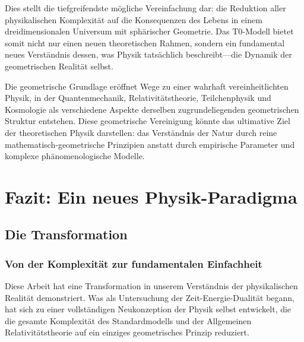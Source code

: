 \documentclass[12pt,a4paper]{report}
\begin{document}
	Dies stellt die tiefgreifendste mögliche Vereinfachung dar: die Reduktion aller physikalischen Komplexität auf die Konsequenzen des Lebens in einem dreidimensionalen Universum mit sphärischer Geometrie. Das T0-Modell bietet somit nicht nur einen neuen theoretischen Rahmen, sondern ein fundamental neues Verständnis dessen, was Physik tatsächlich beschreibt—die Dynamik der geometrischen Realität selbst.
	
	Die geometrische Grundlage eröffnet Wege zu einer wahrhaft vereinheitlichten Physik, in der Quantenmechanik, Relativitätstheorie, Teilchenphysik und Kosmologie als verschiedene Aspekte derselben zugrundeliegenden geometrischen Struktur entstehen. Diese geometrische Vereinigung könnte das ultimative Ziel der theoretischen Physik darstellen: das Verständnis der Natur durch reine mathematisch-geometrische Prinzipien anstatt durch empirische Parameter und komplexe phänomenologische Modelle.
	\chapter{Fazit: Ein neues Physik-Paradigma}
	\label{chap:conclusion}
	
	\section{Die Transformation}
	\label{sec:revolutionary_transformation}
	
	\subsection{Von der Komplexität zur fundamentalen Einfachheit}
	\label{subsec:complexity_to_simplicity}
	
	Diese Arbeit hat eine Transformation in unserem Verständnis der physikalischen Realität demonstriert. Was als Untersuchung der Zeit-Energie-Dualität begann, hat sich zu einer vollständigen Neukonzeption der Physik selbst entwickelt, die die gesamte Komplexität des Standardmodells und der Allgemeinen Relativitätstheorie auf ein einziges geometrisches Prinzip reduziert.
	
\end{document}
